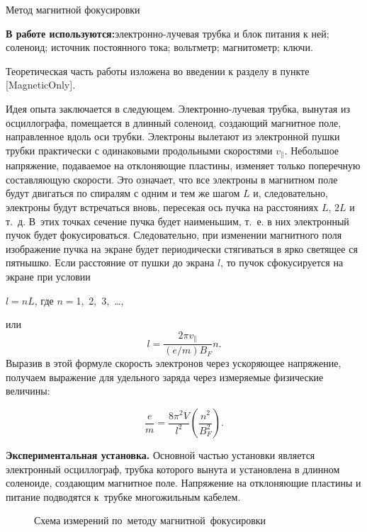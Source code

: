 



{\LARGE  Метод магнитной фокусировки}

{\bf В работе используются:}{электронно-лучевая трубка и блок питания к ней; соленоид; источник постоянного тока; вольтметр;  магнитометр; ключи.}

Теоретическая часть работы изложена во введении к разделу в пункте [MagneticOnly].

Идея опыта заключается в следующем. Электронно-лучевая трубка, вынутая из осциллографа, помещается в длинный соленоид, создающий магнитное поле, направленное вдоль оси трубки. Электроны вылетают из электронной пушки трубки практически с одинаковыми продольными скоростями $v_{\parallel}$. Небольшое напряжение, подаваемое на отклоняющие пластины, изменяет только поперечную составляющую скорости. Это означает, что все электроны в магнитном поле будут двигаться по спиралям с одним и тем же шагом $L$ и, следовательно, электроны будут встречаться вновь, пересекая ось пучка на расстояниях $L$, $2L$ и т.~д. В~этих точках сечение пучка будет наименьшим, т.~е. в них электронный пучок будет фокусироваться. Следовательно, при изменении магнитного поля изображение пучка на экране будет периодически стягиваться в ярко светящее ся пятнышко. Если расстояние от пушки до экрана $l$, то пучок сфокусируется на экране при условии

$l=nL$, где $n=$1,\, 2,\, 3,\, \ldots,

или
$$
l=\frac{2\pi v_{\parallel}}{(e/m)B_F}n.
$$
Выразив в этой формуле скорость электронов через ускоряющее напряжение, получаем выражение для удельного заряда через измеряемые физические величины:

\begin{equation}
\frac{e}{m}=\frac{8\pi^2V}{l^2}\left(\frac{n^2}{B_F^2}\right).
\label{eq3.1.11}
\end{equation}

{\bf Экспериментальная установка.} Основной частью установки является электронный осциллограф, трубка которого вынута и установлена в длинном соленоиде, создающим магнитное поле. Напряжение на отклоняющие пластины и питание подводятся к~трубке многожильным кабелем.

\begin{figure}
\caption{ Схема измерений по~методу магнитной~фокусировки}
\label{fig3.1.1}
\end{figure}

